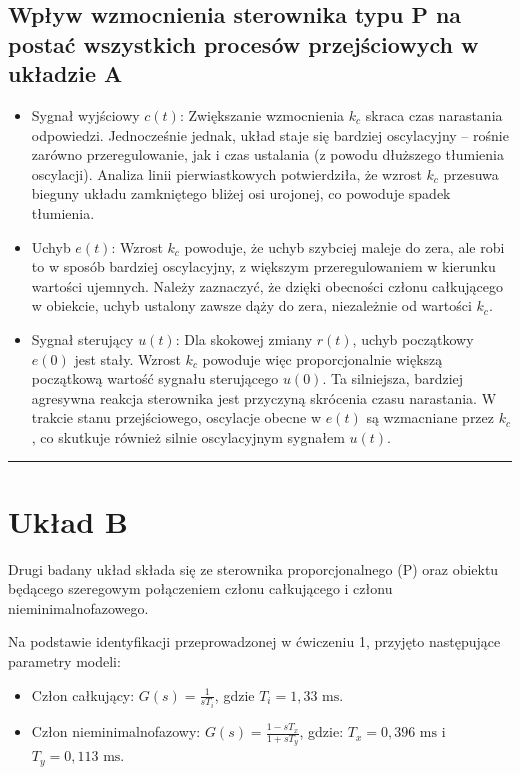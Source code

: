 \documentclass[12pt,a4paper]{article}
\begin{document}
	\subsection{Wpływ wzmocnienia sterownika typu P na postać wszystkich procesów przejściowych w układzie A}
	\begin{itemize}
		\item Sygnał wyjściowy $c(t)$: Zwiększanie wzmocnienia $k_c$ skraca czas narastania odpowiedzi. Jednocześnie jednak, układ staje się bardziej oscylacyjny – rośnie zarówno przeregulowanie, jak i czas ustalania (z powodu dłuższego tłumienia oscylacji). Analiza linii pierwiastkowych potwierdziła, że wzrost $k_c$ przesuwa bieguny układu zamkniętego bliżej osi urojonej, co powoduje spadek tłumienia.
		\item Uchyb $e(t)$: Wzrost $k_c$ powoduje, że uchyb szybciej maleje do zera, ale robi to w sposób bardziej oscylacyjny, z większym przeregulowaniem w kierunku wartości ujemnych. Należy zaznaczyć, że dzięki obecności członu całkującego w obiekcie, uchyb ustalony zawsze dąży do zera, niezależnie od wartości $k_c$.
		\item Sygnał sterujący $u(t)$: Dla skokowej zmiany $r(t)$, uchyb początkowy $e(0)$ jest stały. Wzrost $k_c$ powoduje więc proporcjonalnie większą początkową wartość sygnału sterującego $u(0)$. Ta silniejsza, bardziej agresywna reakcja sterownika jest przyczyną skrócenia czasu narastania. W trakcie stanu przejściowego, oscylacje obecne w $e(t)$ są wzmacniane przez $k_c$, co skutkuje również silnie oscylacyjnym sygnałem $u(t)$.
	\end{itemize}
	
	\bigskip \hrule \bigskip
	
	\section{Układ B}
	
	Drugi badany układ składa się ze sterownika proporcjonalnego (P) oraz obiektu będącego szeregowym połączeniem członu całkującego i członu nieminimalnofazowego.
	
	Na podstawie identyfikacji przeprowadzonej w ćwiczeniu 1, przyjęto następujące parametry modeli:
	\begin{itemize}
		\item Człon całkujący: $G(s) = \frac{1}{sT_i}$, gdzie $T_i = 1,33 \text{ ms}$.
		\item Człon nieminimalnofazowy: $G(s) = \frac{1-sT_x}{1+sT_y}$, gdzie: $T_x = 0,396 \text{ ms}$ i $T_y = 0,113 \text{ ms}$.
	\end{itemize}
	
\end{document}
